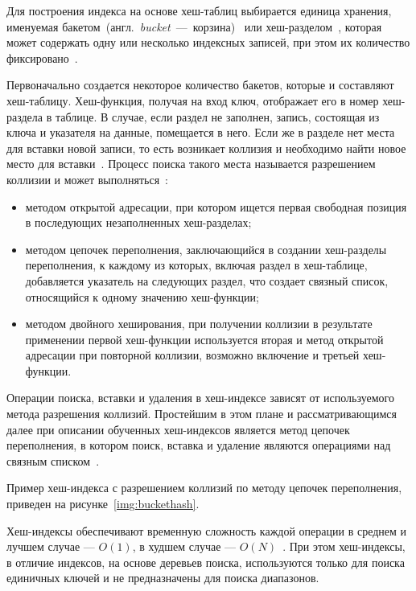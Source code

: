 Для построения индекса на основе хеш-таблиц выбирается единица хранения,
именуемая
\mbox{бакетом}~(англ.~\textit{bucket}~---~\mbox{корзина})~\cite{marvel} или
\mbox{хеш-разделом}~\cite{amur}, которая может содержать одну или
несколько индексных записей, при этом их количество фиксировано~\cite{ship}.

Первоначально создается некоторое количество бакетов, которые и составляют
хеш-таблицу. Хеш-функция, получая на вход ключ, отображает его в номер
хеш-раздела в таблице. В случае, если раздел не заполнен, запись, состоящая из
ключа и указателя на данные, помещается в него. Если же в разделе нет места для
вставки новой записи, то есть возникает коллизия и необходимо найти новое место
для вставки~\cite{marvel}. Процесс поиска такого места называется разрешением
коллизии и может выполняться~\cite{baw}:

\begin{itemize}
    \item методом открытой адресации, при котором ищется первая свободная
        позиция в последующих незаполненных хеш-разделах;
    \item методом цепочек переполнения, заключающийся в создании хеш-разделы
        переполнения, к каждому из которых, включая раздел в хеш-таблице,
        добавляется указатель на следующих раздел, что создает связный список,
        относящийся к одному значению хеш-функции;
    \item методом двойного хеширования, при получении коллизии в
        результате применении первой хеш-функции используется вторая и метод
        открытой адресации при повторной коллизии, возможно включение и третьей
        хеш-функции.
\end{itemize}

Операции поиска, вставки и удаления в хеш-индексе зависят от используемого
метода разрешения коллизий. Простейшим в этом плане и рассматривающимся далее
при описании обученных хеш-индексов является метод цепочек переполнения, в
котором поиск, вставка и удаление являются операциями над связным
списком~\cite{baw}.

Пример хеш-индекса с разрешением коллизий по методу цепочек переполнения,
приведен на рисунке~\ref{img:buckethash}.


Хеш-индексы обеспечивают временную сложность каждой операции в
среднем и лучшем случае --- $O(1)$, в худшем случае --- $O(N)$~\cite{squares}.
При этом хеш-индексы, в отличие индексов, на основе деревьев поиска,
используются только для поиска единичных ключей и не предназначены для поиска
диапазонов.

